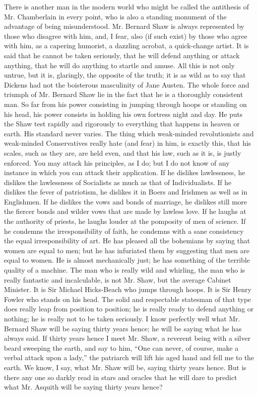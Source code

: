 There is another man in the modern world who might be called the antithesis of Mr. Chamberlain in every point, who is also a standing monument of the advantage of being misunderstood. Mr. Bernard Shaw is always represented by those who disagree with him, and, I fear, also (if such exist) by those who agree with him, as a capering humorist, a dazzling acrobat, a quick-change artist. It is said that he cannot be taken seriously, that he will defend anything or attack anything, that he will do anything to startle and amuse. All this is not only untrue, but it is, glaringly, the opposite of the truth; it is as wild as to say that Dickens had not the boisterous masculinity of Jane Austen. The whole force and triumph of Mr. Bernard Shaw lie in the fact that he is a thoroughly consistent man. So far from his power consisting in jumping through hoops or standing on his head, his power consists in holding his own fortress night and day. He puts the Shaw test rapidly and rigorously to everything that happens in heaven or earth. His standard never varies. The thing which weak-minded revolutionists and weak-minded Conservatives really hate (and fear) in him, is exactly this, that his scales, such as they are, are held even, and that his law, such as it is, is justly enforced. You may attack his principles, as I do; but I do not know of any instance in which you can attack their application. If he dislikes lawlessness, he dislikes the lawlessness of Socialists as much as that of Individualists. If he dislikes the fever of patriotism, he dislikes it in Boers and Irishmen as well as in Englishmen. If he dislikes the vows and bonds of marriage, he dislikes still more the fiercer bonds and wilder vows that are made by lawless love. If he laughs at the authority of priests, he laughs louder at the pomposity of men of science. If he condemns the irresponsibility of faith, he condemns with a sane consistency the equal irresponsibility of art. He has pleased all the bohemians by saying that women are equal to men; but he has infuriated them by suggesting that men are equal to women. He is almost mechanically just; he has something of the terrible quality of a machine. The man who is really wild and whirling, the man who is really fantastic and incalculable, is not Mr. Shaw, but the average Cabinet Minister. It is Sir Michael Hicks-Beach who jumps through hoops. It is Sir Henry Fowler who stands on his head. The solid and respectable statesman of that type does really leap from position to position; he is really ready to defend anything or nothing; he is really not to be taken seriously. I know perfectly well what Mr. Bernard Shaw will be saying thirty years hence; he will be saying what he has always said. If thirty years hence I meet Mr. Shaw, a reverent being with a silver beard sweeping the earth, and say to him, “One can never, of course, make a verbal attack upon a lady,” the patriarch will lift his aged hand and fell me to the earth. We know, I say, what Mr. Shaw will be, saying thirty years hence. But is there any one so darkly read in stars and oracles that he will dare to predict what Mr. Asquith will be saying thirty years hence?

